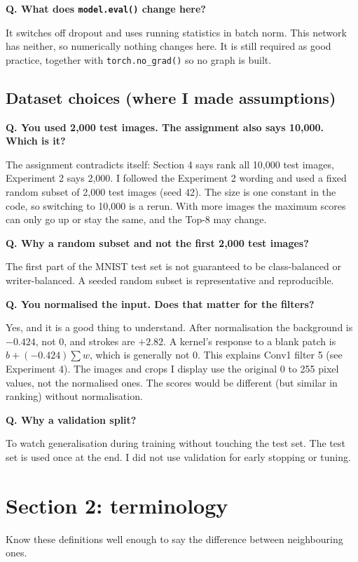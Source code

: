 \documentclass[11pt]{article}
\newcommand{\Q}[1]{\par\vspace{4pt}\noindent\textcolor{qcol}{\textbf{Q. #1}}\par\nopagebreak}
\newcommand{\A}[1]{\noindent #1\par}
\begin{document}
\Q{What does \texttt{model.eval()} change here?}
\A{It switches off dropout and uses running statistics in batch norm. This network has neither, so numerically nothing changes here. It is still required as good practice, together with \texttt{torch.no\_grad()} so no graph is built.}

\subsection{Dataset choices (where I made assumptions)}

\Q{You used 2,000 test images. The assignment also says 10,000. Which is it?}
\A{The assignment contradicts itself: Section 4 says rank all 10,000 test images, Experiment 2 says 2,000. I followed the Experiment 2 wording and used a fixed random subset of 2,000 test images (seed 42). The size is one constant in the code, so switching to 10,000 is a rerun. With more images the maximum scores can only go up or stay the same, and the Top-8 may change.}

\Q{Why a random subset and not the first 2,000 test images?}
\A{The first part of the MNIST test set is not guaranteed to be class-balanced or writer-balanced. A seeded random subset is representative and reproducible.}

\Q{You normalised the input. Does that matter for the filters?}
\A{Yes, and it is a good thing to understand. After normalisation the background is $-0.424$, not 0, and strokes are $+2.82$. A kernel's response to a blank patch is $b+(-0.424)\sum w$, which is generally not 0. This explains Conv1 filter 5 (see Experiment 4). The images and crops I display use the original 0 to 255 pixel values, not the normalised ones. The scores would be different (but similar in ranking) without normalisation.}

\Q{Why a validation split?}
\A{To watch generalisation during training without touching the test set. The test set is used once at the end. I did not use validation for early stopping or tuning.}

\section{Section 2: terminology}

Know these definitions well enough to say the difference between neighbouring ones.
\end{document}
